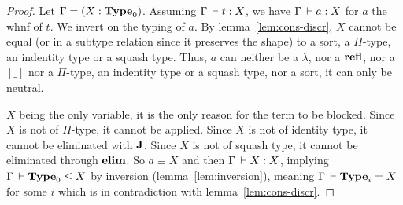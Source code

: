 \documentclass[a4paper,english]{lipics-utf8x}
\begin{document}
  \begin{proof}
    Let $\Gamma = (X : \operatorname{\mathbf{Type}}_0)$.
    Assuming $\Gamma \,\vdash t : X$, we have $\Gamma \,\vdash a : X$ for $a$ the whnf
    of $t$. We invert on the typing of $a$.
    By lemma~\ref{lem:cons-discr}, $X$ cannot be equal (or in a subtype
    relation since it preserves the shape) to a sort, a $\Pi$-type,
    an indentity type or a squash type.
    Thus, $a$ can neither be a $\lambda$, nor a $\operatorname{\mathbf{refl}}$,
    nor a $[\_]$ nor a $\Pi$-type, an indentity type or
    a squash type, nor a sort, it can only be neutral.

    $X$ being the only variable, it is the only reason for the term to be
    blocked.
    Since $X$ is not of $\Pi$-type, it cannot be applied.
    Since $X$ is not of identity type, it cannot be eliminated with $\operatorname{\mathbf{J}}$.
    Since $X$ is not of squash type, it cannot be eliminated through $\operatorname{\mathbf{elim}}$.
    So $a \equiv X$ and then $\Gamma \,\vdash X : X$, implying
    $\Gamma \,\vdash \operatorname{\mathbf{Type}}_0 \le X$ by inversion
    (lemma~\ref{lem:inversion}), meaning $\Gamma \,\vdash \operatorname{\mathbf{Type}}_i = X$ for some
    $i$ which is in contradiction with lemma~\ref{lem:cons-discr}.
  \end{proof}
\end{document}

